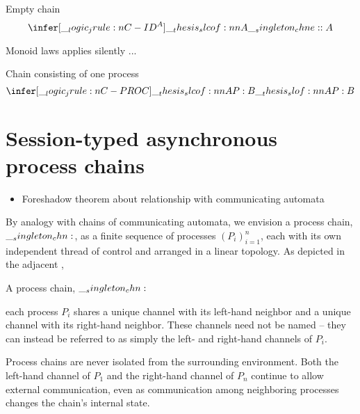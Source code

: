 Empty chain
\begin{equation*}
  \infer[\jrule{C-ID}^A]{\slcof{A |- \chne : A}}{}
\end{equation*}

Monoid laws applies silently  ...

Chain consisting of one process
\begin{equation*}
  \infer[\jrule{C-PROC}]{\slcof{A |- P : B}}{
    \slof{A |- P : B}}
\end{equation*}

\section{Session-typed asynchronous process chains}

\begin{itemize}
\item Foreshadow theorem about relationship with communicating automata
\end{itemize}

By analogy with chains of communicating automata, we envision a process chain, $\__singleton_chn:$, as a finite sequence of processes $(P_i)_{i=1}^{n}$, each with its own independent thread of control and arranged in a linear topology.
As depicted in the adjacent ,%
%
\begin{marginfigure}
  \centering
  \caption{A process chain, $\__singleton_chn:$}\label{fig:singleton-processes:chain-topology}
\end{marginfigure}
%
each process $P_i$ shares a unique channel with its left-hand neighbor and a unique channel with its right-hand neighbor.
These channels need not be named -- they can instead be referred to as simply the left- and right-hand channels of $P_i$.

Process chains are never isolated from the surrounding environment.
Both the left-hand channel of $P_1$ and the right-hand channel of $P_n$ continue to allow external communication, even as communication among neighboring processes changes the chain's internal state.


